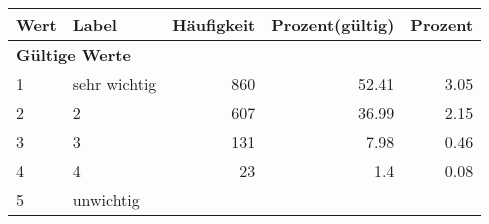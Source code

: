      \begin{longtable}{lXrrr}
     \toprule
     \textbf{Wert} & \textbf{Label} & \textbf{Häufigkeit} & \textbf{Prozent(gültig)} & \textbf{Prozent} \\
     \endhead
     \midrule
     \multicolumn{5}{l}{\textbf{Gültige Werte}}\\

     1 &
     \multicolumn{1}{X}{ sehr wichtig   } &


       \num{860} &
       \num[round-mode=places,round-precision=2]{52.41} &
         \num[round-mode=places,round-precision=2]{3.05} \\

     2 &
     \multicolumn{1}{X}{ 2   } &


       \num{607} &
       \num[round-mode=places,round-precision=2]{36.99} &
         \num[round-mode=places,round-precision=2]{2.15} \\

     3 &
     \multicolumn{1}{X}{ 3   } &


       \num{131} &
       \num[round-mode=places,round-precision=2]{7.98} &
         \num[round-mode=places,round-precision=2]{0.46} \\

     4 &
     \multicolumn{1}{X}{ 4   } &


       \num{23} &
       \num[round-mode=places,round-precision=2]{1.4} &
         \num[round-mode=places,round-precision=2]{0.08} \\

     5 &
     \multicolumn{1}{X}{ unwichtig   } &



\end{longtable}

